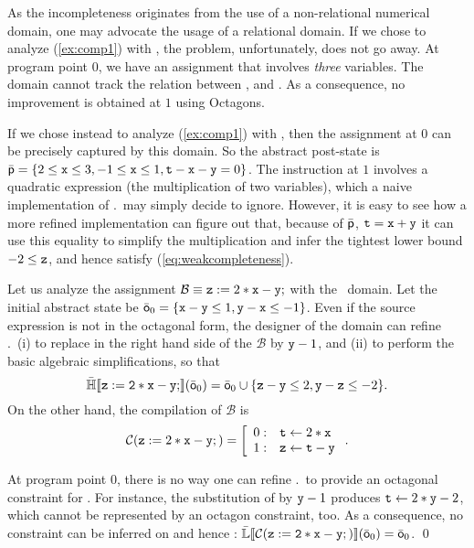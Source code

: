 \documentclass{llncs}
\begin{document}
As the incompleteness originates from the use of a non-relational
numerical domain, one may advocate the usage of a relational domain.
If we chose to analyze (\ref{ex:comp1}) with \Octagons, the problem,
unfortunately, does not go away.
At program point $0$, we have an assignment that involves \emph{three} variables.
The domain cannot track the relation between ,  and .
As a consequence, no improvement is obtained at $1$ using Octagons.

If we chose instead to analyze (\ref{ex:comp1}) with \Polyhedra, then
the assignment at $0$ can be precisely captured by this domain.  So
the abstract post-state is $\bar{\mathsf{p}} = \{ 2 \leq \mathtt{x} \leq 3, -1
\leq \mathtt{x} \leq 1, \mathtt{t} - \mathtt{x} -\mathtt{y} = 0\}$.  
The instruction at $1$ involves a quadratic expression (the
multiplication of two variables), which a naive implementation of
\Polyhedra.\aassign\ may simply decide to ignore.  However, it is easy
to see how a more refined implementation can figure out that, because
of $\bar{\mathsf{p}}$, $\mathtt{t} = \mathtt{x} + \mathtt{y}$ it can use this
equality to simplify the multiplication and infer the tightest lower
bound $-2 \leq \mathtt{z}$, and hence satisfy
(\ref{eq:weakcompleteness}).


\begin{example}
Let us analyze the assignment $\mathcal{B} \equiv \mathtt{z} := 2
*\mathtt{x} - \mathtt{y};$ with the \Octagons\ domain.  Let the initial
abstract state be $\bar{\mathsf{o}}_0 = \{ \mathtt{x} -\mathtt{y} \leq 1, \mathtt{y}
- \mathtt{x} \leq -1 \}$.  Even if the source expression is not in the
octagonal form, the designer of the domain can refine
\Octagons.\aassign\ (i) to replace  in the right hand side of
the $\mathcal{B}$ by $\mathtt{y} - 1$, and (ii) to perform the basic
algebraic simplifications, so that
\[
\mathbb{\bar{H}}\llbracket \mathtt{\mathtt{z} := 2 *\mathtt{x} - \mathtt{y};} \rrbracket(\bar{\mathsf{o}}_0) = \bar{\mathsf{o}}_0 \cup \{ \mathtt{z} - \mathtt{y} \leq 2, \mathtt{y} - \mathtt{z} \leq -2 \}.
\]
On the other hand, the compilation of $\mathcal{B}$ is 
\begin{equation}
  \mathcal{C}(\mathtt{z} := 2*\mathtt{x} - \mathtt{y};) = \left [
    \begin{array}{r l}
      0: & \mathtt{t} \leftarrow 2 * \mathtt{x} \\
      1: & \mathtt{z} \leftarrow \mathtt{t} - \mathtt{y}
    \end{array} \right. .
  \label{ex:comp2}
\end{equation}
\end{example}
At program point $0$, there is no way one can refine
\Octagons.\aassign\ to provide an octagonal constraint for .
For instance, the substitution of  by $\mathtt{y} -1$ produces
$\mathtt{t} \leftarrow 2 * \mathtt{y} - 2$, which cannot be represented by an
octagon constraint, too.  As a consequence, no constraint can be
inferred on  and hence : $\mathbb{\bar{L}}\llbracket \mathtt{\mathcal{C}(\mathtt{z} := 2
*\mathtt{x} - \mathtt{y};)} \rrbracket(\bar{\mathsf{o}}_0) = \bar{\mathsf{o}}_0$. \qed
\end{document}
